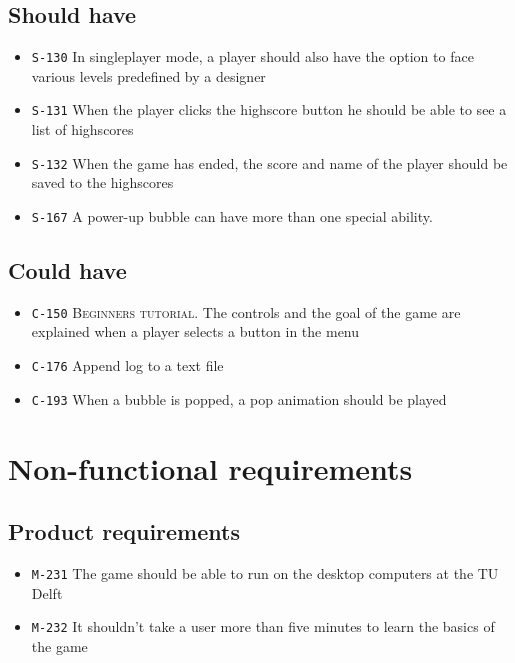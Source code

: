 \documentclass[a4paper]{article}
\begin{document}
\subsection{Should have}

\begin{itemize}
      \item \texttt{S-130} In singleplayer mode, a player should also have the option to face various levels predefined by a designer
      \item \texttt{S-131} When the player clicks the highscore button he should be able to see a list of highscores
      \item \texttt{S-132} When the game has ended, the score and name of the player should be saved to the highscores
      \item \texttt{S-167} A power-up bubble can have more than one special ability.
\end{itemize}

\subsection{Could have}

\begin{itemize}
	\item \texttt{C-150} \textsc{Beginners tutorial.} The controls and the goal of the game are explained when a player selects a button in the menu
      \item \texttt{C-176} Append log to a text file
      \item \texttt{C-193} When a bubble is popped, a pop animation should be played
\end{itemize}


\section{Non-functional requirements}
\subsection{Product requirements}

\begin{itemize}
  \item \texttt{M-231} The game should be able to run on the desktop computers at the TU Delft
  \item \texttt{M-232} It shouldn't take a user more than five minutes to learn the basics of the game
\end{itemize}
\end{document}
